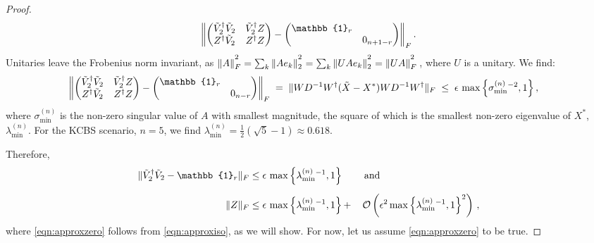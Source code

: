 \begin{proof}
\begin{equation*}
\left\|
\begin{pmatrix}
\Tilde{V}_2^{\dag}\Tilde{V}_2 & \Tilde{V}_2^{\dag} Z \\
Z^{\dag}\Tilde{V}_2 & Z^{\dag}Z
\end{pmatrix}
-
\begin{pmatrix}
\mathbb{1}_r & \\
& 0_{n+1-r}
\end{pmatrix}
\right\|_F.
\end{equation*}
Unitaries leave the Frobenius norm invariant, as $\|A\|_F^{\textstyle ^2}=\sum_k\|Ae_k\|_2^{\textstyle ^2} = \sum_k \|UAe_k\|_2^{\textstyle ^2}=\|UA\|_F^{\textstyle ^2}\thinspace$, where $U$ is a unitary. We find:
\begin{align*}
\left\|
\begin{pmatrix}
\Tilde{V}_2^{\dag}\Tilde{V}_2 & \Tilde{V}_2^{\dag} Z \\
Z^{\dag}\Tilde{V}_2 & Z^{\dag}Z
\end{pmatrix}
-
\begin{pmatrix}
\mathbb{1}_r & \\
& 0_{n-r}
\end{pmatrix}
\right\|_F\;=\;\|WD^{-1}W^{\dag}(\Tilde{X}-X^*)WD^{-1}W^{\dag}\|_F\; & \leq\; \epsilon\thinspace \operatorname{max}\left\{\sigma_{\text{min}}^{(n)}{}^{-2},1\right\},
\end{align*}
where $\sigma_{\text{min}}^{(n)}$ is the non-zero singular value of $A$ with smallest magnitude, the square of which is the smallest non-zero eigenvalue of $X^*$, $\lambda_{\text{min}}^{(n)}$.
For the KCBS scenario, $n=5$, we find $\lambda_{\text{min}}^{(n)}=\frac{1}{2}(\sqrt{5}-1)\approx 0.618$.

Therefore,
\begin{alignat}{2}
\label{eqn:approxiso}
\|\Tilde{V}_2^{\dag}\Tilde{V}_2-\mathbb{1}_r\|_F & \leq \epsilon\thinspace \operatorname{max}\left\{\lambda_{\text{min}}^{(n)}{}^{-1},1\right\} &&\text{ and}\\[0.5em]\label{eqn:approxzero}
\|Z\|_F & \leq \epsilon\thinspace\operatorname{max}\left\{\lambda_{\text{min}}^{(n)}{}^{-1},1\right\}+&&\thinspace\mathcal{O} \left(\epsilon^2\operatorname{max}\left\{\lambda_{\text{min}}^{(n)}{}^{-1},1\right\}^2\right)\thinspace,
\end{alignat}
where \ref{eqn:approxzero} follows from \ref{eqn:approxiso}, as we will show. For now, let us assume \ref{eqn:approxzero} to be true.


\end{proof}
